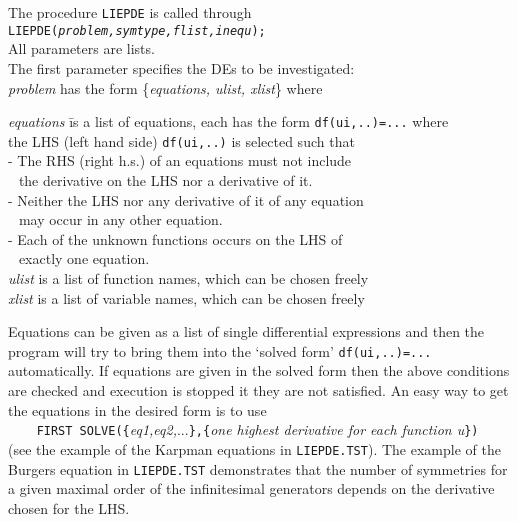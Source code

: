 \documentclass[12pt]{article}
\begin{document}
The procedure {\tt LIEPDE} is called through \\
{\tt LIEPDE({\it problem,symtype,flist,inequ}); } \\
All parameters are lists. \vspace{6pt} \\
The first parameter specifies the DEs to be investigated: \\
{\it problem} has the form \{{\it equations, ulist, xlist}\} where
\begin{tabbing}
\hspace{0.5cm}
 {\it equations } \=  is a list of equations,
              each has the form {\tt df(ui,..)=...} where \\
       \> the LHS (left hand side) {\tt df(ui,..)} is selected such that \\
       \>  - The RHS (right h.s.) of an equations must not include     \\
       \>$\;\,$ the derivative on the LHS nor a derivative of it.  \\
       \>  - Neither the LHS nor any derivative of it of any equation \\
       \>$\;\,$ may occur in any other equation.\\
       \>  - Each of the unknown functions occurs on the LHS of \\
       \>$\;\,$ exactly one equation.  \\
\hspace{0.5cm}
 {\it ulist} \>  is a list of function names, which can be chosen freely \\
\hspace{0.5cm}
 {\it xlist}  \>  is a list of variable names, which can be chosen freely 
\end{tabbing}
Equations can be given as a list of single differential expressions and then
the program will try to bring them into the `solved form' {\tt df(ui,..)=...}
automatically. If equations are given in the solved form then the above
conditions are checked and execution is stopped it they are not satisfied.
An easy way to get the equations in the desired form is to use \\
\verb+    FIRST SOLVE({+{\it eq1,eq2,}...\verb+},{+{\it one highest
derivative for each function u}\verb+})+  \\
(see the example of the Karpman equations in {\tt LIEPDE.TST}). 
The example of the Burgers equation in {\tt LIEPDE.TST} demonstrates 
that the number of symmetries for a given maximal order of the infinitesimal
generators depends on the derivative chosen for the LHS.
\end{document}
